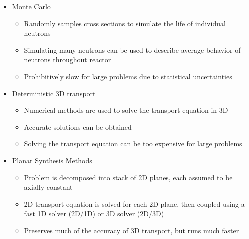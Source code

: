 \begin{frame}

\begin{itemize}
    \item Monte Carlo
    \begin{itemize}
        \item Randomly samples cross sections to simulate the life of individual neutrons
        \item Simulating many neutrons can be used to describe average behavior of neutrons throughout reactor
        \item Prohibitively slow for large problems due to statistical uncertainties
    \end{itemize}
    \item Deterministic 3D transport
    \begin{itemize}
        \item Numerical methods are used to solve the transport equation in 3D
        \item Accurate solutions can be obtained
        \item Solving the transport equation can be too expensive for large problems
    \end{itemize}
    \item Planar Synthesis Methods
    \begin{itemize}
        \item Problem is decomposed into stack of 2D planes, each assumed to be axially constant
        \item 2D transport equation is solved for each 2D plane, then coupled using a fast 1D solver (2D/1D) or 3D solver (2D/3D)
        \item Preserves much of the accuracy of 3D transport, but runs much faster
    \end{itemize}
\end{itemize}

\end{frame}


